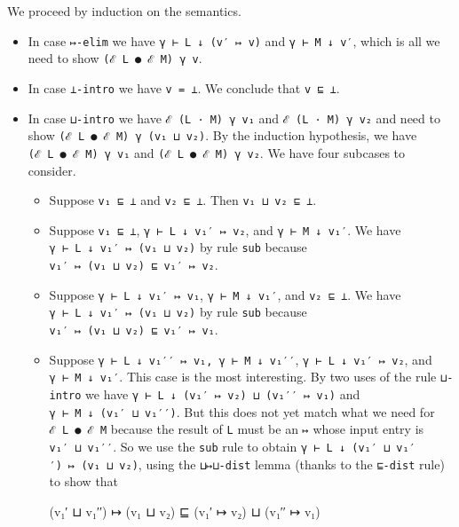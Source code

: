 We proceed by induction on the semantics.

\begin{itemize}
\item
  In case \texttt{↦-elim} we have \texttt{γ\ ⊢\ L\ ↓\ (v′\ ↦\ v)} and
  \texttt{γ\ ⊢\ M\ ↓\ v′}, which is all we need to show
  \texttt{(ℰ\ L\ ●\ ℰ\ M)\ γ\ v}.
\item
  In case \texttt{⊥-intro} we have \texttt{v\ =\ ⊥}. We conclude that
  \texttt{v\ ⊑\ ⊥}.
\item
  In case \texttt{⊔-intro} we have \texttt{ℰ\ (L\ ·\ M)\ γ\ v₁} and
  \texttt{ℰ\ (L\ ·\ M)\ γ\ v₂} and need to show
  \texttt{(ℰ\ L\ ●\ ℰ\ M)\ γ\ (v₁\ ⊔\ v₂)}. By the induction hypothesis,
  we have \texttt{(ℰ\ L\ ●\ ℰ\ M)\ γ\ v₁} and
  \texttt{(ℰ\ L\ ●\ ℰ\ M)\ γ\ v₂}. We have four subcases to consider.

  \begin{itemize}
  \item
    Suppose \texttt{v₁\ ⊑\ ⊥} and \texttt{v₂\ ⊑\ ⊥}. Then
    \texttt{v₁\ ⊔\ v₂\ ⊑\ ⊥}.
  \item
    Suppose \texttt{v₁\ ⊑\ ⊥}, \texttt{γ\ ⊢\ L\ ↓\ v₁′\ ↦\ v₂}, and
    \texttt{γ\ ⊢\ M\ ↓\ v₁′}. We have
    \texttt{γ\ ⊢\ L\ ↓\ v₁′\ ↦\ (v₁\ ⊔\ v₂)} by rule \texttt{sub}
    because \texttt{v₁′\ ↦\ (v₁\ ⊔\ v₂)\ ⊑\ v₁′\ ↦\ v₂}.
  \item
    Suppose \texttt{γ\ ⊢\ L\ ↓\ v₁′\ ↦\ v₁}, \texttt{γ\ ⊢\ M\ ↓\ v₁′},
    and \texttt{v₂\ ⊑\ ⊥}. We have
    \texttt{γ\ ⊢\ L\ ↓\ v₁′\ ↦\ (v₁\ ⊔\ v₂)} by rule \texttt{sub}
    because \texttt{v₁′\ ↦\ (v₁\ ⊔\ v₂)\ ⊑\ v₁′\ ↦\ v₁}.
  \item
    Suppose \texttt{γ\ ⊢\ L\ ↓\ v₁′′\ ↦\ v₁,\ γ\ ⊢\ M\ ↓\ v₁′′},
    \texttt{γ\ ⊢\ L\ ↓\ v₁′\ ↦\ v₂}, and \texttt{γ\ ⊢\ M\ ↓\ v₁′}. This
    case is the most interesting. By two uses of the rule
    \texttt{⊔-intro} we have
    \texttt{γ\ ⊢\ L\ ↓\ (v₁′\ ↦\ v₂)\ ⊔\ (v₁′′\ ↦\ v₁)} and
    \texttt{γ\ ⊢\ M\ ↓\ (v₁′\ ⊔\ v₁′′)}. But this does not yet match
    what we need for \texttt{ℰ\ L\ ●\ ℰ\ M} because the result of
    \texttt{L} must be an \texttt{↦} whose input entry is
    \texttt{v₁′\ ⊔\ v₁′′}. So we use the \texttt{sub} rule to obtain
    \texttt{γ\ ⊢\ L\ ↓\ (v₁′\ ⊔\ v₁′′)\ ↦\ (v₁\ ⊔\ v₂)}, using the
    \texttt{⊔↦⊔-dist} lemma (thanks to the \texttt{⊑-dist} rule) to show
    that

    \begin{myDisplay}
      (v₁′ ⊔ v₁′′) ↦ (v₁ ⊔ v₂) ⊑ (v₁′ ↦ v₂) ⊔ (v₁′′ ↦ v₁)
    \end{myDisplay}


\end{itemize}
\end{itemize}
